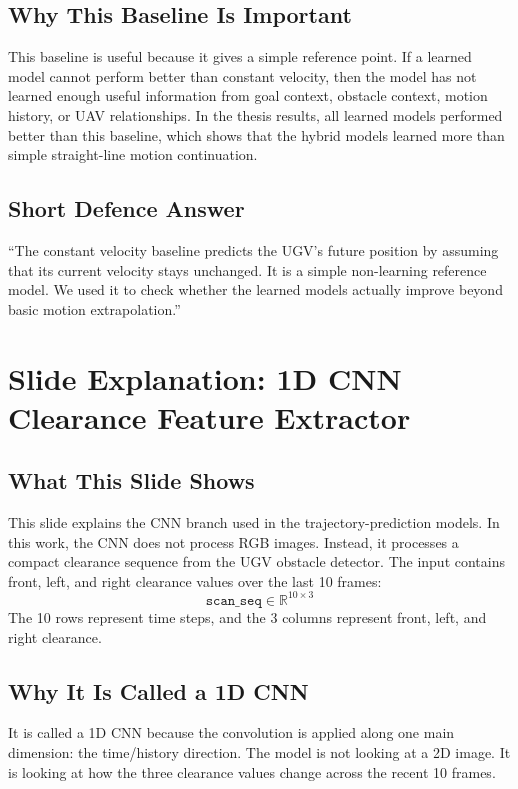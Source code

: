 \documentclass[11pt,a4paper]{article}
\begin{document}
\subsection*{Why This Baseline Is Important}
This baseline is useful because it gives a simple reference point. If a learned
model cannot perform better than constant velocity, then the model has not
learned enough useful information from goal context, obstacle context, motion
history, or UAV relationships. In the thesis results, all learned models
performed better than this baseline, which shows that the hybrid models learned
more than simple straight-line motion continuation.

\subsection*{Short Defence Answer}
``The constant velocity baseline predicts the UGV's future position by assuming
that its current velocity stays unchanged. It is a simple non-learning reference
model. We used it to check whether the learned models actually improve beyond
basic motion extrapolation.''

\newpage
\section*{Slide Explanation: 1D CNN Clearance Feature Extractor}

\subsection*{What This Slide Shows}
This slide explains the CNN branch used in the trajectory-prediction models.
In this work, the CNN does not process RGB images. Instead, it processes a
compact clearance sequence from the UGV obstacle detector. The input contains
front, left, and right clearance values over the last 10 frames:
\[
    \texttt{scan\_seq} \in \mathbb{R}^{10 \times 3}
\]
The 10 rows represent time steps, and the 3 columns represent front, left, and
right clearance.

\subsection*{Why It Is Called a 1D CNN}
It is called a 1D CNN because the convolution is applied along one main
dimension: the time/history direction. The model is not looking at a 2D image.
It is looking at how the three clearance values change across the recent 10
frames.
\end{document}
